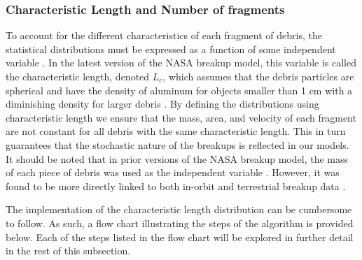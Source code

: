 \documentclass[a4paper, 12pt]{article}
\begin{document}
\subsubsection{Characteristic Length and Number of fragments}

To account for the different characteristics of each fragment of debris, the statistical distributions must be expressed as a function of some independent variable \citep{johnson_nasas_2001}. In the latest version of the NASA breakup model, this variable is called the characteristic length, denoted $L_c$, which assumes that the debris particles are spherical and have the density of aluminum for objects smaller than 1 cm with a diminishing density for larger debris \citep{johnson_nasas_2001}. By defining the distributions using characteristic length we ensure that the mass, area, and velocity of each fragment are not constant for all debris with the same characteristic length. This in turn guarantees that the stochastic nature of the breakups is reflected in our models. It should be noted that in prior versions of the NASA breakup model, the mass of each piece of debris was used as the independent variable \citep{krisko_proper_2011}. However, it was found to be more directly linked to both in-orbit and terrestrial breakup data \citep{johnson_nasas_2001}.

The implementation of the characteristic length distribution can be cumbersome to follow. As such, a flow chart illustrating the steps of the algorithm is provided below. Each of the steps listed in the flow chart will be explored in further detail in the rest of this subsection.
\end{document}
